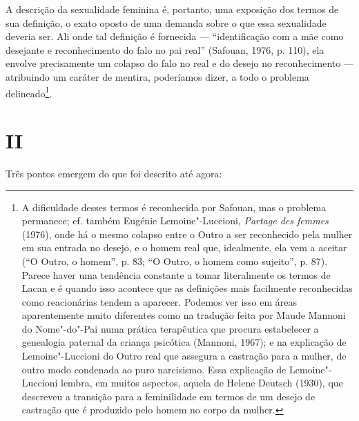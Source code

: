 A descrição da sexualidade feminina é, portanto, uma exposição dos
termos de sua definição, o exato oposto de uma demanda sobre o que essa
sexualidade deveria ser. Ali onde tal definição é fornecida ---
``identificação com a mãe como desejante e reconhecimento do falo no pai
real'' (Safouan, 1976, p. 110), ela envolve precisamente um colapso do
falo no real e do desejo no reconhecimento ­--- atribuindo um caráter de
mentira, poderíamos dizer, a todo o problema delineado\footnote{A
  dificuldade desses termos é reconhecida por Safouan, mas o problema
  permanece; cf. também Eugénie Lemoine"-Luccioni, \emph{Partage des
  femmes} (1976), onde há o mesmo colapso entre o Outro a ser
  reconhecido pela mulher em sua entrada no desejo, e o homem real que,
  idealmente, ela vem a aceitar (``O Outro, o homem'', p. 83; ``O Outro,
  o homem como sujeito'', p. 87). Parece haver uma tendência constante a
  tomar literalmente os termos de Lacan e é quando isso acontece que as
  definições mais facilmente reconhecidas como reacionárias tendem a
  aparecer. Podemos ver isso em áreas aparentemente muito diferentes
  como na tradução feita por Maude Mannoni do Nome"-do"-Pai numa prática
  terapêutica que procura estabelecer a genealogia paternal da criança
  psicótica (Mannoni, 1967); e na explicação de Lemoine"-Luccioni do
  Outro real que assegura a castração para a mulher, de outro modo
  condenada ao puro narcisismo. Essa explicação de Lemoine"-Luccioni
  lembra, em muitos aspectos, aquela de Helene Deutsch (1930), que
  descreveu a transição para a feminilidade em termos de um desejo de
  castração que é produzido pelo homem no corpo da mulher.}.

\section{II}

Três pontos emergem do que foi descrito até agora:

